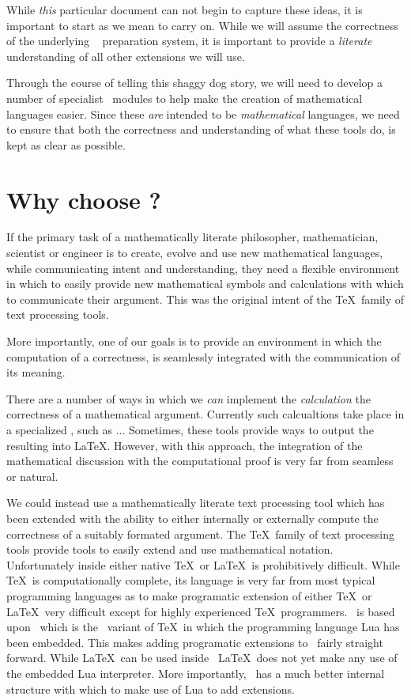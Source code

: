 While \emph{this} particular document can not begin to capture these 
ideas, it is important to start as we mean to carry on. While we will 
assume the correctness of the underlying \ConTeXt\LuaTeX\  
preparation system, it is important to provide a \emph{literate} 
understanding of all other extensions we will use. 

Through the course of telling this shaggy dog story, we will need to 
develop a number of specialist \ConTeXt\ modules to help make the creation 
of mathematical languages easier. Since these \emph{are} intended to be 
\emph{mathematical} languages, we need to ensure that both the correctness 
and understanding of what these tools do, is kept as clear as possible.

\section{Why choose \ConTeXt?}

If the primary task of a mathematically literate philosopher, 
mathematician, scientist or engineer is to create, evolve and use new 
mathematical languages, while communicating intent and understanding, they 
need a flexible environment in which to easily provide new mathematical 
symbols and calculations with which to communicate their argument. This 
was the original intent of the \TeX\ family of text processing tools.

More importantly, one of our goals is to provide an environment in which 
the computation of a  correctness, is seamlessly 
integrated with the communication of its meaning.

There are a number of ways in which we \emph{can} implement the 
\emph{calculation} the correctness of a mathematical argument. Currently 
such calcualtions take place in a specialized , such as ... Sometimes, these tools provide ways to output the 
resulting  into \LaTeX. However, with this approach, the 
integration of the mathematical discussion with the computational proof is 
very far from seamless or natural. 

We could instead use a mathematically literate text processing tool which 
has been extended with the ability to either internally or externally 
compute the correctness of a suitably formated argument. The \TeX\ family 
of text processing tools provide tools to easily extend and use 
mathematical notation. Unfortunately  inside either 
native \TeX\ or \LaTeX\ is prohibitively difficult. While \TeX\ is 
computationally complete, its  language is very 
far from most typical programming languages as to make programatic 
extension of either \TeX\ or \LaTeX\ very difficult except for highly 
experienced \TeX\ programmers. \ConTeXt\ is based upon \LuaTeX\ which is 
the \pdfTeX\ variant of \TeX\ in which the programming language Lua has 
been embedded. This makes adding programatic extensions to \ConTeXt\ 
fairly straight forward. While \LaTeX\ can be used inside \LuaTeX\, 
\LaTeX\ does not yet make any use of the embedded Lua interpreter. More 
importantly, \ConTeXt\, has a much better internal structure with which to 
make use of Lua to add extensions. 

